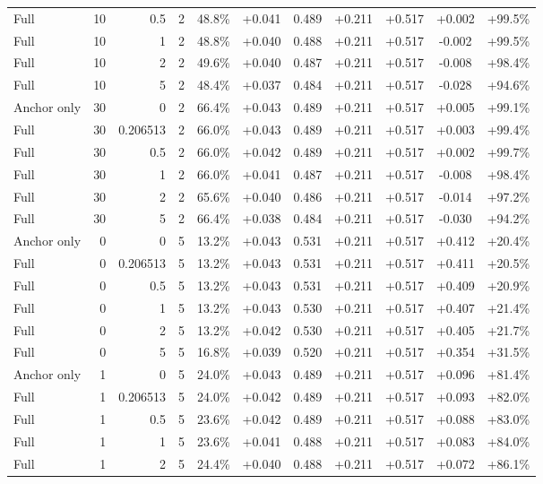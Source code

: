 \begin{table}[htbp]
\begin{tabular}{lrrrccccccc}
Full & 10 & 0.5 & 2 & 48.8\% & +0.041 & 0.489 & +0.211 & +0.517 & +0.002 & +99.5\% \\
Full & 10 & 1 & 2 & 48.8\% & +0.040 & 0.488 & +0.211 & +0.517 & -0.002 & +99.5\% \\
Full & 10 & 2 & 2 & 49.6\% & +0.040 & 0.487 & +0.211 & +0.517 & -0.008 & +98.4\% \\
Full & 10 & 5 & 2 & 48.4\% & +0.037 & 0.484 & +0.211 & +0.517 & -0.028 & +94.6\% \\
Anchor only & 30 & 0 & 2 & 66.4\% & +0.043 & 0.489 & +0.211 & +0.517 & +0.005 & +99.1\% \\
Full & 30 & 0.206513 & 2 & 66.0\% & +0.043 & 0.489 & +0.211 & +0.517 & +0.003 & +99.4\% \\
Full & 30 & 0.5 & 2 & 66.0\% & +0.042 & 0.489 & +0.211 & +0.517 & +0.002 & +99.7\% \\
Full & 30 & 1 & 2 & 66.0\% & +0.041 & 0.487 & +0.211 & +0.517 & -0.008 & +98.4\% \\
Full & 30 & 2 & 2 & 65.6\% & +0.040 & 0.486 & +0.211 & +0.517 & -0.014 & +97.2\% \\
Full & 30 & 5 & 2 & 66.4\% & +0.038 & 0.484 & +0.211 & +0.517 & -0.030 & +94.2\% \\
Anchor only & 0 & 0 & 5 & 13.2\% & +0.043 & 0.531 & +0.211 & +0.517 & +0.412 & +20.4\% \\
Full & 0 & 0.206513 & 5 & 13.2\% & +0.043 & 0.531 & +0.211 & +0.517 & +0.411 & +20.5\% \\
Full & 0 & 0.5 & 5 & 13.2\% & +0.043 & 0.531 & +0.211 & +0.517 & +0.409 & +20.9\% \\
Full & 0 & 1 & 5 & 13.2\% & +0.043 & 0.530 & +0.211 & +0.517 & +0.407 & +21.4\% \\
Full & 0 & 2 & 5 & 13.2\% & +0.042 & 0.530 & +0.211 & +0.517 & +0.405 & +21.7\% \\
Full & 0 & 5 & 5 & 16.8\% & +0.039 & 0.520 & +0.211 & +0.517 & +0.354 & +31.5\% \\
Anchor only & 1 & 0 & 5 & 24.0\% & +0.043 & 0.489 & +0.211 & +0.517 & +0.096 & +81.4\% \\
Full & 1 & 0.206513 & 5 & 24.0\% & +0.042 & 0.489 & +0.211 & +0.517 & +0.093 & +82.0\% \\
Full & 1 & 0.5 & 5 & 23.6\% & +0.042 & 0.489 & +0.211 & +0.517 & +0.088 & +83.0\% \\
Full & 1 & 1 & 5 & 23.6\% & +0.041 & 0.488 & +0.211 & +0.517 & +0.083 & +84.0\% \\
Full & 1 & 2 & 5 & 24.4\% & +0.040 & 0.488 & +0.211 & +0.517 & +0.072 & +86.1\% \\

\end{tabular}
\end{table}

